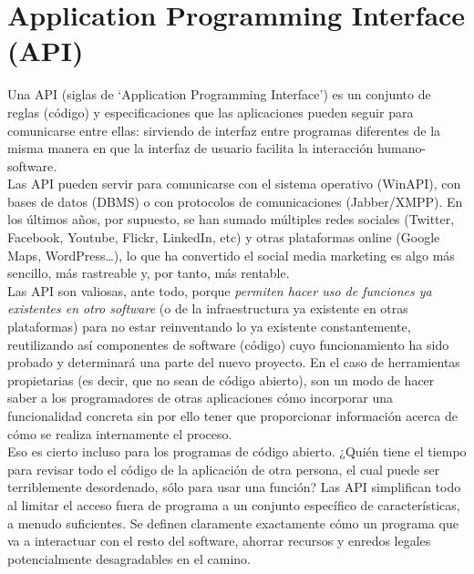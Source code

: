  \section{Application Programming Interface (API)}
 	Una API (siglas de ‘Application Programming Interface’) es un conjunto de reglas (código) y especificaciones que las aplicaciones pueden seguir para comunicarse entre ellas: sirviendo de interfaz entre programas diferentes de la misma manera en que la interfaz de usuario facilita la interacción humano-software.\\

	Las API pueden servir para comunicarse con el sistema operativo (WinAPI), con bases de datos (DBMS) o con protocolos de comunicaciones (Jabber/XMPP). En los últimos años, por supuesto, se han sumado múltiples redes sociales (Twitter, Facebook, Youtube, Flickr, LinkedIn, etc) y otras plataformas online (Google Maps, WordPress…), lo que ha convertido el social media marketing es algo más sencillo, más rastreable y, por tanto, más rentable.\\
	\newpage
	Las API son valiosas, ante todo, porque \emph{permiten hacer uso de funciones ya existentes en otro software} (o de la infraestructura ya existente en otras plataformas) para no estar reinventando lo ya existente constantemente, reutilizando así componentes de software (código) cuyo funcionamiento ha sido probado y determinará una parte del nuevo proyecto. En el caso de herramientas propietarias (es decir, que no sean de código abierto), son un modo de hacer saber a los programadores de otras aplicaciones cómo incorporar una funcionalidad concreta sin por ello tener que proporcionar información acerca de cómo se realiza internamente el proceso. \cite{3}\\

	Eso es cierto incluso para los programas de código abierto. ¿Quién tiene el tiempo para revisar todo el código de la aplicación de otra persona, el cual puede ser terriblemente desordenado, sólo para usar una función? Las API simplifican todo al limitar el acceso fuera de programa a un conjunto específico de características, a menudo suficientes. Se definen claramente exactamente cómo un programa que va a interactuar con el resto del software, ahorrar recursos y enredos legales potencialmente desagradables en el camino. \cite{10}
